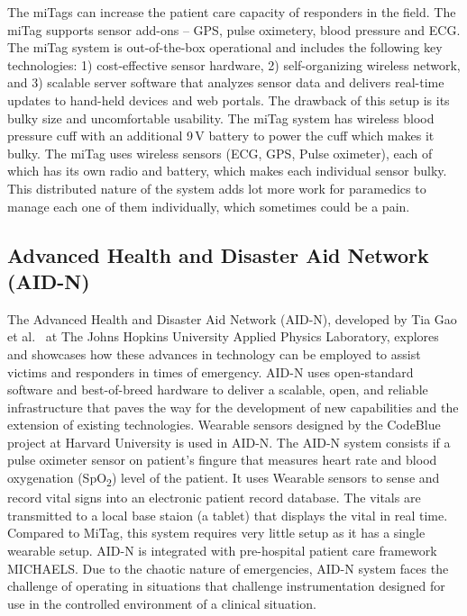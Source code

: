 The miTags can increase the patient care capacity of responders in
the field. The miTag supports sensor add-ons -- GPS, pulse oximetery,
blood pressure and ECG.  The miTag system is out-of-the-box
operational and includes the following key technologies: 1)
cost-effective sensor hardware, 2) self-organizing wireless network,
and 3) scalable server software that analyzes sensor data and
delivers real-time updates to hand-held devices and web portals. The
drawback of this setup is its bulky size and uncomfortable usability.
The miTag system has wireless blood pressure cuff with an additional
9\,V battery to power the cuff which makes it bulky. The miTag uses
wireless sensors (ECG, GPS, Pulse oximeter), each of which has its
own radio and battery, which makes each individual sensor bulky. This
distributed nature of the system adds lot more work for paramedics to
manage each one of them individually, which sometimes could be a
pain. 


\subsection{Advanced Health
	and Disaster Aid Network (AID-N)}

The Advanced Health and Disaster Aid Network (AID-N), developed by
Tia Gao et al.~\cite{AID-N} at The Johns Hopkins University Applied
Physics Laboratory, explores and showcases how these advances in
technology can be employed to assist victims and responders in times
of emergency. AID-N uses open-standard software and best-of-breed
hardware to deliver a scalable, open, and reliable infrastructure
that paves the way for the development of new capabilities and the
extension of existing technologies.  Wearable sensors designed by the
CodeBlue project at Harvard University is used in AID-N. The AID-N
system consists if a pulse oximeter sensor on patient's fingure that
measures heart rate and blood oxygenation (SpO\textsubscript{2})
level of the patient. It uses Wearable sensors to sense and record
vital signs into an electronic patient record database. The vitals
are transmitted to a local base staion (a tablet) that displays the
vital in real time. Compared to MiTag, this system requires very
little setup as it has a single wearable setup. AID-N is integrated
with pre-hospital patient care framework MICHAELS. Due to the chaotic
nature of emergencies, AID-N system faces the challenge of operating
in situations that challenge instrumentation designed for use in the
controlled environment of a clinical situation. 


